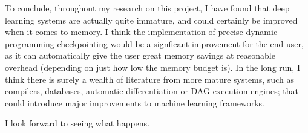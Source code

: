 To conclude, throughout my research on this project, I have found that deep learning systems are actually quite immature, and could certainly be improved when it comes to memory.
I think the implementation of precise dynamic programming checkpointing would be a signficant improvement for the end-user, as it can automatically give the user great memory savings at reasonable overhead (depending on just how low the memory budget is).
In the long run, I think there is surely a wealth of literature from more mature systems, such as compilers, databases, automatic differentiation or DAG execution engines;
that could introduce major improvements to machine learning frameworks.

I look forward to seeing what happens.
